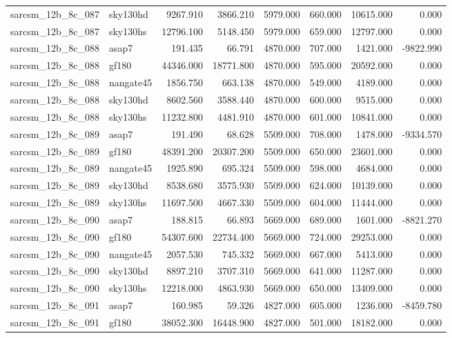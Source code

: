 \begin{tabular}{llrrrrrr}
sarcsm\_12b\_8c\_087 & sky130hd & 9267.910 & 3866.210 & 5979.000 & 660.000 & 10615.000 & 0.000 \\
sarcsm\_12b\_8c\_087 & sky130hs & 12796.100 & 5148.450 & 5979.000 & 659.000 & 12797.000 & 0.000 \\
sarcsm\_12b\_8c\_088 & asap7 & 191.435 & 66.791 & 4870.000 & 707.000 & 1421.000 & -9822.990 \\
sarcsm\_12b\_8c\_088 & gf180 & 44346.000 & 18771.800 & 4870.000 & 595.000 & 20592.000 & 0.000 \\
sarcsm\_12b\_8c\_088 & nangate45 & 1856.750 & 663.138 & 4870.000 & 549.000 & 4189.000 & 0.000 \\
sarcsm\_12b\_8c\_088 & sky130hd & 8602.560 & 3588.440 & 4870.000 & 600.000 & 9515.000 & 0.000 \\
sarcsm\_12b\_8c\_088 & sky130hs & 11232.800 & 4481.910 & 4870.000 & 601.000 & 10841.000 & 0.000 \\
sarcsm\_12b\_8c\_089 & asap7 & 191.490 & 68.628 & 5509.000 & 708.000 & 1478.000 & -9334.570 \\
sarcsm\_12b\_8c\_089 & gf180 & 48391.200 & 20307.200 & 5509.000 & 650.000 & 23601.000 & 0.000 \\
sarcsm\_12b\_8c\_089 & nangate45 & 1925.890 & 695.324 & 5509.000 & 598.000 & 4684.000 & 0.000 \\
sarcsm\_12b\_8c\_089 & sky130hd & 8538.680 & 3575.930 & 5509.000 & 624.000 & 10139.000 & 0.000 \\
sarcsm\_12b\_8c\_089 & sky130hs & 11697.500 & 4667.330 & 5509.000 & 604.000 & 11444.000 & 0.000 \\
sarcsm\_12b\_8c\_090 & asap7 & 188.815 & 66.893 & 5669.000 & 689.000 & 1601.000 & -8821.270 \\
sarcsm\_12b\_8c\_090 & gf180 & 54307.600 & 22734.400 & 5669.000 & 724.000 & 29253.000 & 0.000 \\
sarcsm\_12b\_8c\_090 & nangate45 & 2057.530 & 745.332 & 5669.000 & 667.000 & 5413.000 & 0.000 \\
sarcsm\_12b\_8c\_090 & sky130hd & 8897.210 & 3707.310 & 5669.000 & 641.000 & 11287.000 & 0.000 \\
sarcsm\_12b\_8c\_090 & sky130hs & 12218.000 & 4863.930 & 5669.000 & 650.000 & 13409.000 & 0.000 \\
sarcsm\_12b\_8c\_091 & asap7 & 160.985 & 59.326 & 4827.000 & 605.000 & 1236.000 & -8459.780 \\
sarcsm\_12b\_8c\_091 & gf180 & 38052.300 & 16448.900 & 4827.000 & 501.000 & 18182.000 & 0.000 \\

\end{tabular}
